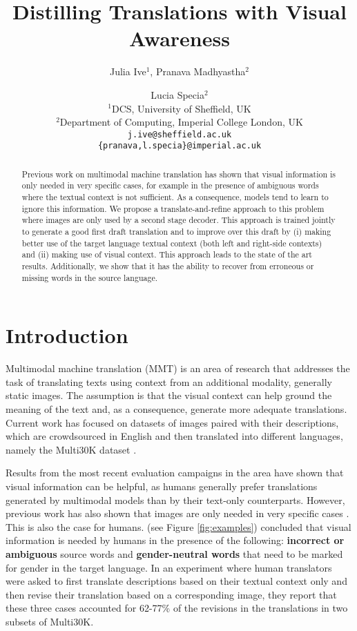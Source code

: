 \documentclass[11pt,a4paper]{article}
\title{Distilling Translations with Visual Awareness}
\author{Julia Ive$^{1}$, Pranava Madhyastha$^{2}$ \and Lucia Specia$^{2}$\\
  $^{1}$DCS, University of Sheffield, UK\\
  $^{2}$Department of Computing, Imperial College London, UK \\
  {\tt j.ive@sheffield.ac.uk}\\
{\tt \{pranava,l.specia\}@imperial.ac.uk} \\}
\date{}
\begin{document}
\maketitle
\begin{abstract}
Previous work on multimodal machine translation has shown that visual information is only needed in very specific cases, for example in the presence of ambiguous words where the textual context is not sufficient. As a consequence, models tend to learn to ignore this information. 
We propose a translate-and-refine approach to this problem where images are only used by a second stage decoder. This approach is trained jointly to generate a good first draft translation and to improve over this draft by (i) making better use of the target language textual context (both left and right-side contexts) and (ii) making use of visual context. This approach leads to the state of the art results. Additionally, we show that it has the ability to recover from erroneous or missing words in the source language.
\end{abstract}

\section{Introduction}\label{sec:intro}

Multimodal machine translation (MMT) is an area of research that addresses the task of translating texts using context from an additional modality, generally static images. The assumption is that the visual context can help ground the meaning of the text and, as a consequence, generate more adequate translations. 
Current work has focused on datasets of images paired with their descriptions, which are crowdsourced in English and then translated into different languages, namely the Multi30K dataset \cite{elliott-etall_VL:2016}.

Results from the most recent evaluation campaigns in the area \cite{elliott-EtAl:2017:WMT,BarraultEtAl:2018} have shown that visual information can be helpful, as humans generally prefer translations generated by multimodal models than by their text-only counterparts. However, previous work has also shown that images are only needed in very specific cases \cite{lala-EtAl:2018:WMT}. This is also the case for humans.  (see Figure \ref{fig:examples}) concluded that visual information is needed by humans in the presence of the following: {\bf incorrect or ambiguous} source words and {\bf gender-neutral words} that need to be marked for gender in the target language. In an experiment where human translators were asked to first translate descriptions based on their textual context only and then revise their translation based on a corresponding image, they report that these three cases accounted for 62-77\% of the revisions in the translations in two subsets of Multi30K.  
\end{document}
